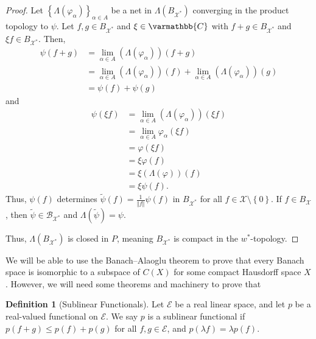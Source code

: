 \documentclass[12pt]{extarticle}
\newcommand{\C}{\mathbb{C}}
\newcommand{\norm}[1]{\left\Vert #1\right\Vert}
\newcommand{\set}[1]{\left\{#1\right\}}
\theoremstyle{plain}
\theoremstyle{definition}
\newtheorem*{definition}{Definition}
\theoremstyle{note}
\renewcommand*{\mathbb}[1]{\varmathbb{#1}}
\renewcommand{\newline}{\hfill\break}
\begin{document}
\begin{proof}
  Let $\set{\Lambda\left(\varphi_{\alpha}\right)}_{\alpha\in A}$ be a net in $\Lambda\left(B_{\mathcal{X}^{\ast}}\right)$ converging in the product topology to $\psi$. Let $f,g \in B_{\mathcal{X}^{\ast}}$ and $\xi \in \C$ with $f+g\in B_{\mathcal{X}^{\ast}}$ and $\xi f \in B_{\mathcal{X}^{\ast}}$. Then,
  \begin{align*}
    \psi\left(f+g\right) &= \lim_{\alpha \in A}\left(\Lambda\left(\varphi_{\alpha}\right)\right)(f+g)\\
                         &= \lim_{\alpha \in A}\left(\Lambda\left(\varphi_{\alpha}\right)\right)(f) + \lim_{\alpha \in A}\left(\Lambda\left(\varphi_{\alpha}\right)\right)(g)\\
                         &= \psi(f) + \psi(g)
  \end{align*}
  and
  \begin{align*}
    \psi(\xi f) &= \lim_{\alpha \in A}\left(\Lambda\left(\varphi_{\alpha}\right)\right)(\xi f)\\
                 &= \lim_{\alpha \in A}\varphi_{\alpha}\left(\xi f\right)\\
                 &= \varphi\left(\xi f\right)\\
                 &= \xi \varphi\left(f\right)\\
                 &= \xi \left(\Lambda\left(\varphi\right)\right)(f)\\
                 &= \xi \psi(f).
  \end{align*}
  Thus, $\psi(f)$ determines $\tilde{\psi}(f) = \frac{1}{\norm{f}}\psi\left(f\right)$ in $B_{\mathcal{X}^{\ast}}$ for all $f\in \mathcal{X}\setminus \set{0}$. If $f\in B_{\mathcal{X}}$, then $\tilde{\psi} \in \mathcal{B}_{\mathcal{X}^{\ast}}$ and $\Lambda(\tilde{\psi}) = \psi$.\newline

  Thus, $\Lambda\left(B_{\mathcal{X}^{\ast}}\right)$ is closed in $P$, meaning $B_{\mathcal{X}^{\ast}}$ is compact in the $w^{\ast}$-topology.
\end{proof}
We will be able to use the Banach--Alaoglu theorem to prove that every Banach space is isomorphic to a subspace of $C(X)$ for some compact Hausdorff space $X$. However, we will need some theorems and machinery to prove that
\begin{definition}[Sublinear Functionals]
  Let $\mathcal{E}$ be a real linear space, and let $p$ be a real-valued functional on $\mathcal{E}$. We say $p$ is a sublinear functional if $p(f+g)\leq p(f) + p(g)$ for all $f,g\in \mathcal{E}$, and $p(\lambda f) = \lambda p(f)$.
\end{definition}
\end{document}
